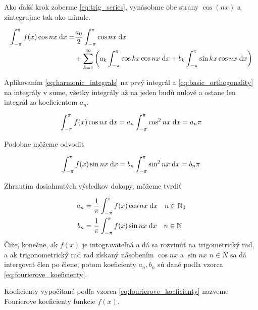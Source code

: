 Ako ďalší krok zoberme \ref{eq:trig_series}, vynásobme obe strany
$\cos(nx)$ a zintegrujme tak ako minule.

\begin{equation}
    \begin{split}
    \int_{-\pi}^{\pi} f(x) \cos nx  \; \mathrm{d} x =& \frac{a_0}{2} \int_{-\pi}^{\pi} \cos nx \; \mathrm{d} x 
    \\ &+
        \sum_{k=1}^{\infty} \left(
            a_k \int_{-\pi}^{\pi} \cos kx \cos nx \; \mathrm{d} x + 
            b_k \int_{-\pi}^{\pi} \sin kx \cos nx \; \mathrm{d} x
        \right)
    \end{split}
\end{equation}

Aplikovaním \ref{eq:harmonic_integrals} na prvý integrál a 
\ref{eq:basic_orthogonality} na integrály v sume, všetky integrály
až na jeden budú nulové a ostane len integrál za koeficientom $a_n$.

\begin{equation}
    \int_{-\pi}^{\pi} f(x) \cos nx \; \mathrm{d} x = a_n \int_{-\pi}^{\pi} \cos^2 nx \; \mathrm{d} x = a_n \pi
\end{equation}

Podobne môžeme odvodiť

\begin{equation}
    \int_{-\pi}^{\pi} f(x) \sin nx \; \mathrm{d} x = b_n \int_{-\pi}^{\pi} \sin^2 nx \; \mathrm{d} x = b_n \pi
\end{equation}

Zhrnutím dosiahnutých výsledkov dokopy, môžeme tvrdiť

\begin{equation}
\begin{split}
    a_n &=  \frac{1}{\pi} \int_{-\pi}^{\pi} f(x) \cos n x \; \mathrm{d} x \quad n\in \mathbb{N}_0 \\
    b_n &=  \frac{1}{\pi} \int_{-\pi}^{\pi} f(x) \sin n x \; \mathrm{d} x \quad n\in \mathbb{N}
\end{split}    
    \label{eq:fourierove_koeficienty}
\end{equation}
Čiže, konečne, ak $f(x)$ je intogravateľná a dá sa rozvinúť na
trigometrický rad, a ak trigonometrický rad rad získaný násobením
$\cos nx$ a $\sin nx$ $n\in N$ sa dá intergovať člen po člene,
potom koeficienty $a_n, b_n$ sú dané podľa vzorca
\ref{eq:fourierove_koeficienty}.

\begin{definicia}
    Koeficienty vypočítané podľa vzorca
    \ref{eq:fourierove_koeficienty} nazveme Fourierove koeficienty
    funkcie $f(x)$.
\end{definicia}


